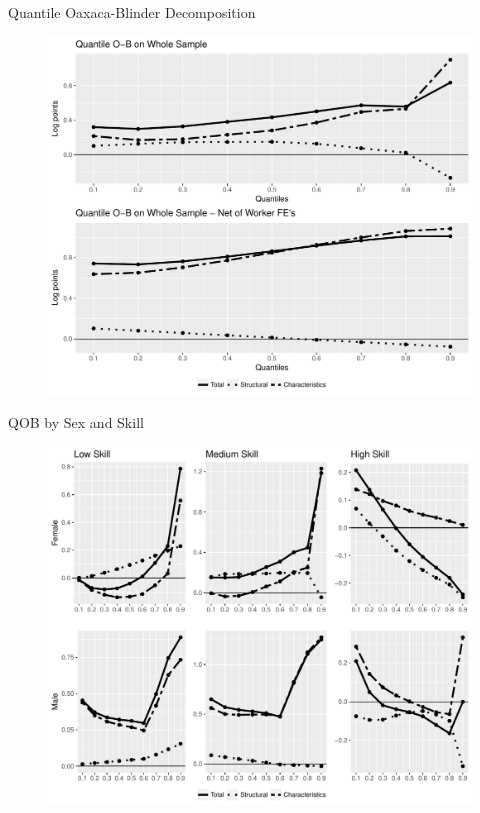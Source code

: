 \documentclass[xcolor={dvipsnames},8pt]{beamer}
\theoremstyle{definition}
\begin{document}
\begin{frame}{Quantile Oaxaca-Blinder Decomposition}
\begin{figure}[h]
    \centering
    \includegraphics[scale = 0.45]{graphs/003_qob_debug.pdf}
\end{figure}
\end{frame}

\begin{frame}{QOB by Sex and Skill}

\begin{figure}[h]
    \centering
    \includegraphics[scale = 0.45]{graphs/003_qob_gs_debug.pdf}
\end{figure}

\end{frame}
\end{document}
